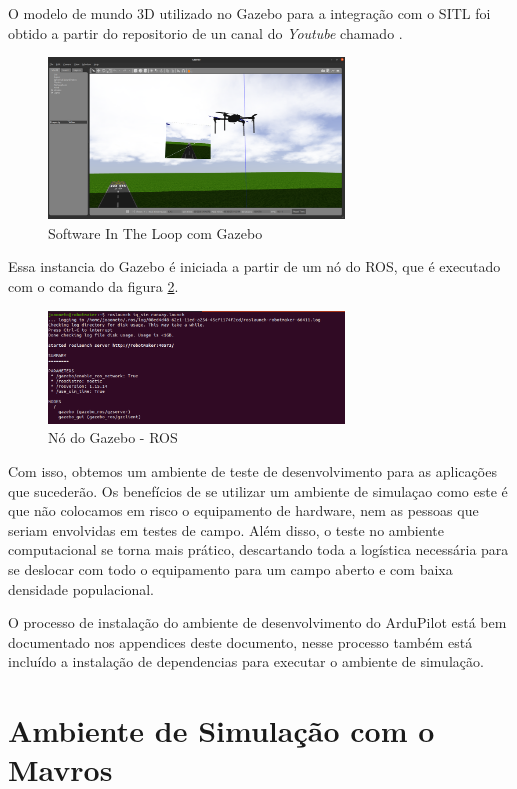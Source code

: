 \documentclass[12pt,a4paper,oneside]{book}
\begin{document}
O modelo de mundo 3D utilizado no Gazebo para a integração com o SITL foi obtido a partir do repositorio de un canal do \textit{Youtube} chamado \cite{url:iq}. 
%
\begin{figure}[H]
  \centering
  \includegraphics[width=0.7\textwidth]{Images/Desenvolvimento/sitl_gazebo.png}
  \caption{Software In The Loop com Gazebo}
  \label{fig:sitl_gazebo.png.0}
\end{figure}
%
Essa instancia do Gazebo é iniciada a partir de um nó do ROS, que é executado com o comando da figura \ref{fig:ros_gazebo.png.0}.
%
\begin{figure}[H]
  \centering
  \includegraphics[width=0.7\textwidth]{Images/Desenvolvimento/ros_gazebo.png}
  \caption{Nó do Gazebo - ROS}
  \label{fig:ros_gazebo.png.0}
\end{figure}
%

Com isso, obtemos um ambiente de teste de desenvolvimento para as aplicações que sucederão. Os benefícios de se utilizar um ambiente de simulaçao como este é que não colocamos em risco o equipamento de hardware, nem as pessoas que seriam envolvidas em testes de campo. Além disso, o teste no ambiente computacional se torna mais prático, descartando toda a logística necessária para se deslocar com todo o equipamento para um campo aberto e com baixa densidade populacional.

O processo de instalação do ambiente de desenvolvimento do ArduPilot está bem documentado nos appendices deste documento, nesse processo também está incluído a instalação de dependencias para executar o ambiente de simulação. 

\section{Ambiente de Simulação com o Mavros}
\end{document}
